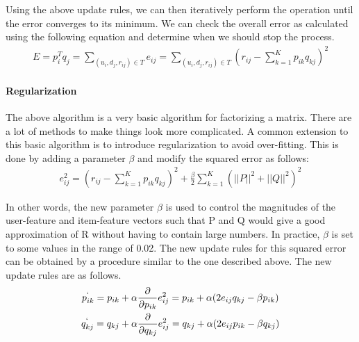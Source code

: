  Using the above update rules, we can then iteratively perform the operation until the error converges to its minimum. We can check the overall error as calculated using the following equation and determine when we should stop the process.
  \begin{gather*}
    E = p_i^{T}q_j = \sum_{(u_i,d_j,r_{ij})\in T} e_{ij} = \sum_{(u_i,d_j,r_{ij})\in T} (r_{ij} - \sum_{k=1}^{K}p_{ik}q_{kj})^2
  \end{gather*}
\paragraph{Regularization}

 The above algorithm is a very basic algorithm for factorizing a matrix. There are a lot of methods to make things look more complicated. A common extension to this basic algorithm is to introduce regularization to avoid over-fitting. This is done by adding a parameter $\beta$ and modify the squared error as follows:
  \begin{gather*}
    e_{ij}^2 = (r_{ij} - \sum_{k=1}^{K}p_{ik}q_{kj})^2 + \frac{\beta}{2}\sum_{k=1}^{K}(||P||^2 + ||Q||^2)^2
  \end{gather*}

 In other words, the new parameter $\beta$ is used to control the magnitudes of the user-feature and item-feature vectors such that P and Q would give a good approximation of R without having to contain large numbers. In practice, $\beta$ is set to some values in the range of 0.02. The new update rules for this squared error can be obtained by a procedure similar to the one described above. The new update rules are as follows.
\begin{gather*}
      p^`_{ik} = p_{ik} + \alpha\frac{\partial}{\partial p_{ik}}e_{ij}^2 = p_{ik} + \alpha(2e_{ij}q_{kj} - \beta p_{ik}) \\
      q^`_{kj} = q_{kj} + \alpha\frac{\partial}{\partial q_{kj}}e_{ij}^2 = q_{kj} + \alpha(2e_{ij}p_{ik} - \beta q_{kj})
  \end{gather*}
